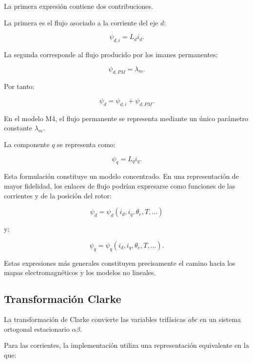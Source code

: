 La primera expresión contiene dos contribuciones.

La primera es el flujo asociado a la corriente del eje $d$:

\begin{equation}
\psi_{d,i}=L_di_d.
\end{equation}

La segunda corresponde al flujo producido por los imanes permanentes:

\begin{equation}
\psi_{d,PM}=\lambda_m.
\end{equation}

Por tanto:

\begin{equation}
\psi_d
=
\psi_{d,i}
+
\psi_{d,PM}.
\end{equation}

En el modelo M4, el flujo permanente se representa mediante un único parámetro constante $\lambda_m$.

La componente $q$ se representa como:

\begin{equation}
\psi_q=L_qi_q.
\end{equation}

Esta formulación constituye un modelo concentrado. En una representación de mayor fidelidad, los enlaces de flujo podrían expresarse como funciones de las corrientes y de la posición del rotor:

\begin{equation}
\psi_d
=
\psi_d(i_d,i_q,\theta_e,T,\ldots)
\end{equation}

y:

\begin{equation}
\psi_q
=
\psi_q(i_d,i_q,\theta_e,T,\ldots).
\end{equation}

Estas expresiones más generales constituyen precisamente el camino hacia los mapas electromagnéticos y los modelos no lineales.

\subsection{Transformación Clarke}

La transformación de Clarke convierte las variables trifásicas $abc$ en un sistema ortogonal estacionario $\alpha\beta$.

Para las corrientes, la implementación utiliza una representación equivalente en la que:

